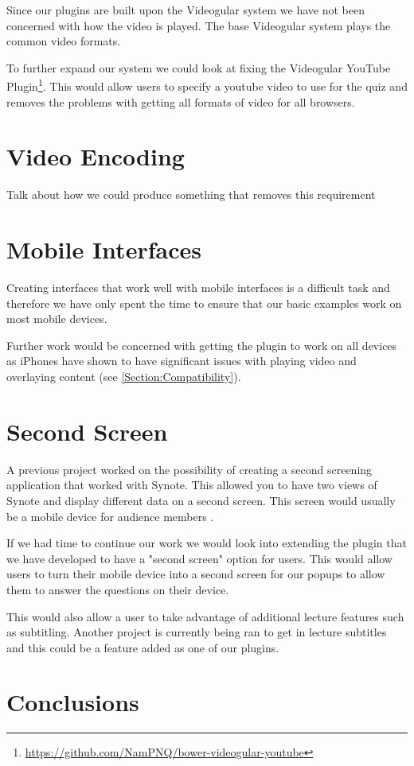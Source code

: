 Since our plugins are built upon the \gls{Videogular} system we have not been concerned with how the video is played. The base \gls{Videogular} system plays the common video formats.

To further expand our system we could look at fixing the \gls{Videogular} YouTube Plugin\footnote{\url{https://github.com/NamPNQ/bower-videogular-youtube}}. This would allow users to specify a youtube video to use for the quiz and removes the problems with getting all formats of video for all browsers.

\section{Video Encoding}

Talk about how we could produce something that removes this requirement

\section{Mobile Interfaces}

Creating interfaces that work well with mobile interfaces is a difficult task and therefore we have only spent the time to ensure that our basic examples work on most mobile devices.

Further work would be concerned with getting the plugin to work on all devices as iPhones have shown to have significant issues with playing video and overlaying content (see \autoref{Section:Compatibility}).

\section{Second Screen}

A previous project  worked on the possibility of creating a second screening application that worked with Synote. This allowed you to have two views of Synote and display different data on a second screen. This screen would usually be a mobile device for audience members .

If we had time to continue our work we would look into extending the plugin that we have developed to have a "second screen" option for users. This would allow users to turn their mobile device into a second screen for our popups to allow them to answer the questions on their device.

This would also allow a user to take advantage of additional lecture features such as subtitling. Another project is currently being ran to get in lecture subtitles and this could be a feature added as one of our plugins.

\section{Conclusions}
